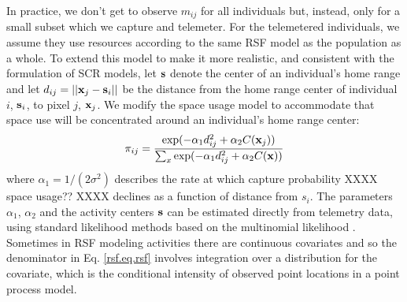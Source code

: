 In practice, we don't get to observe $m_{ij}$ for all individuals but,
instead, only for a small subset which we capture and telemeter.  
For the telemetered individuals, we assume
they use resources according to the same RSF model as the population as
a whole.  To extend this model to make it more realistic, and
consistent with the formulation of SCR models, let ${\bf s}$ denote
the center of an individual's home range and let $d_{ij} = ||{\bf
  x}_{j} - {\bf s}_{i}||$ be the distance from the home range center
of individual $i$, ${\bf s}_{i}$, to pixel $j$, ${\bf x}_{j}$. We
modify the space usage model to accommodate that space use will be
concentrated around an individual's home range center:
\begin{equation}
 \pi_{ij} = \frac{ \exp( -\alpha_{1} d_{ij}^{2} +\alpha_{2} C({\bf x}_{j}) ) }
{ \sum_{x} \exp(-\alpha_{1} d_{ij}^{2} +\alpha_{2} C({\bf x}))}
\label{rsf.eq.rsf}
\end{equation}
where $\alpha_1=1/(2\sigma^2)$ describes the rate at which capture
probability XXXX space usage?? XXXX declines as a function of distance from $s_i$.  The parameters
$\alpha_{1}$, $\alpha_{2}$ and the activity centers ${\bf s}$ can be
estimated directly from telemetry data, using standard
likelihood methods based on the multinomial likelihood
\citep{johnson_etal:2008}.
Sometimes in RSF modeling activities there are continuous
covariates and so the denominator in Eq. \ref{rsf.eq.rsf} involves 
integration over a distribution for the covariate, which is the
conditional intensity of observed point locations in a point process
model. 



